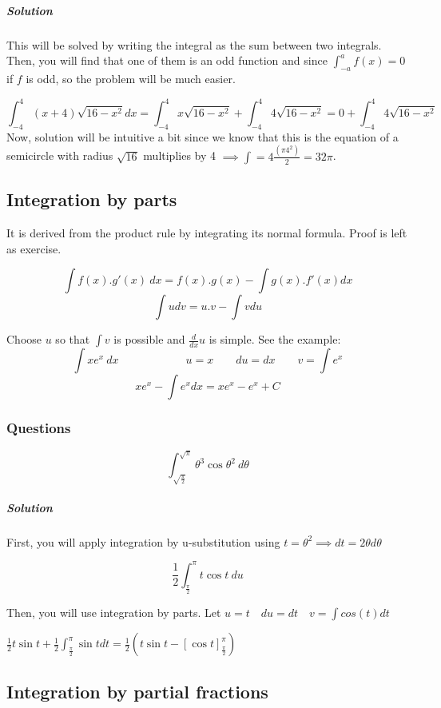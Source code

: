 \documentclass{article}
\begin{document}
\begin{enumerate}[1.]
			\subparagraph{Solution}
			This will be solved by writing the integral as the sum between two integrals. Then, you will find that one of them is an odd function and since $ \int^a_{-a}f(x) = 0 $ if $ f $ is odd, so the problem will be much easier.

			\[ \int^4_{-4} (x+4) \sqrt{ 16-x^2 } dx 
			= \int^4_{-4} x  \sqrt{ 16-x^2 } + \int^4_{-4} 4  \sqrt{ 16-x^2 } = 0 + \int^4_{-4} 4  \sqrt{ 16-x^2 }
			\]
			Now, solution will be intuitive a bit since we know that this is the equation of a semicircle with radius $ \sqrt{16} $ multiplies by 4 $ \implies \int = 4 \frac{ (\pi 4^2) } {2} = 32\pi  $.
			\subsection{Integration by parts}

			It is derived from the product rule by integrating its normal formula. Proof is left as exercise.

			\[
				\int f(x). g'(x)\ dx=f(x).g(x)-\int g(x).f'(x) dx
			\]
			\[
				\int u dv = u.v - \int v du 
			\]

			Choose $ u $ so that $ \int{v}$ is possible and $ \frac{d}{dx} u $ is simple. See the example:
			\[
				\int x e^x\ dx \qquad \qquad \qquad u = x \qquad du = dx \qquad  v = \int e^x
			\]
			\[
				xe^x- \int e^x dx  = xe^x-e^x+C
			\]

			\subsubsection{Questions}

			\[
				\int^{\sqrt{\pi}}_{\sqrt{\frac{\pi}{2}}} \theta^3 \cos{ \theta^2 }\ d \theta  
			\]
			\subparagraph{Solution}
			First, you will apply integration by u-substitution using $ t = \theta^2 \implies dt = 2\theta d \theta$  

			\[
				\frac{1}{2}	\int^{\pi}_{\frac{\pi}{2}} t \cos{ t }\ du 
			\]

			Then, you will use integration by parts. Let $ u = t \quad du = dt \quad v = \int cos(t)dt$

			$ \frac{1}{2} t \sin{ t } + \frac{1}{2} \int^{\pi}_{\frac{\pi}{2}} \sin{ t } dt = \frac{1}{2} ( t \sin t - [\cos{ t }]^{\pi}_{\frac{\pi}{2}} ) $


	\end{enumerate}

	\subsection{Integration by partial fractions}
\end{document}
